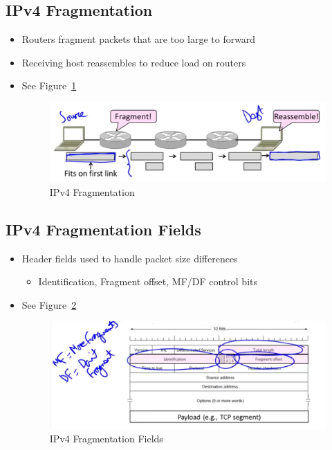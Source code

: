 \documentclass[12pt]{ctexart}   %
\begin{document}
	\subsection{IPv4 Fragmentation}
	\begin{itemize}
		\item Routers fragment packets that are too large to forward
		\item Receiving host reassembles to reduce load on routers
		\item See Figure~\ref{fig:4-7-1}
		
		\begin{figure}[h!] %
		\centering
		 \includegraphics[scale=0.7]{images/4-7-1}
		\caption{ IPv4 Fragmentation }
		 \label{fig:4-7-1}
		 \end{figure}
	\end{itemize}
	
	\subsection{IPv4 Fragmentation Fields}
	\begin{itemize}
		\item Header fields used to handle packet size differences
		\begin{itemize}
			\item Identification, Fragment offset, MF/DF control bits
		\end{itemize}
		\item See Figure~\ref{fig:4-7-2}
		
		\begin{figure}[h!] %
		\centering
		 \includegraphics[scale=0.7]{images/4-7-2}
		\caption{ IPv4 Fragmentation Fields }
		 \label{fig:4-7-2}
		 \end{figure}
	\end{itemize}
	
\end{document}
